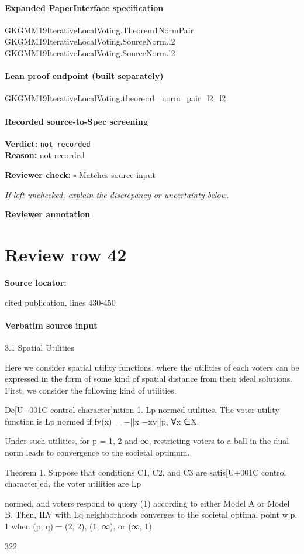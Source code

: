 \documentclass[10pt]{article}
\newcommand{\reviewerbox}{%
  \par\noindent\fbox{\parbox{0.96\linewidth}{\rule{0pt}{0.38in}}}\par
}
\newcommand{\reviewmatch}[1]{%
  \par\noindent\textbf{Reviewer check:} $\square$\; #1\par
  \noindent\emph{If left unchecked, explain the discrepancy or uncertainty below.}\par
}
\begin{document}
\paragraph{Expanded PaperInterface specification}
\begin{ReviewVerbatim}
GKGMM19IterativeLocalVoting.Theorem1NormPair GKGMM19IterativeLocalVoting.SourceNorm.l2
  GKGMM19IterativeLocalVoting.SourceNorm.l2
\end{ReviewVerbatim}

\paragraph{Lean proof endpoint (built separately)}\begin{ReviewVerbatim}
GKGMM19IterativeLocalVoting.theorem1_norm_pair_l2_l2
\end{ReviewVerbatim}

\paragraph{Recorded source-to-Spec screening}
\textbf{Verdict:} \texttt{not recorded}
\\
\textbf{Reason:} not recorded
\reviewmatch{Matches source input}
\noindent\textbf{Reviewer annotation}\par
\reviewerbox
\clearpage
\hypertarget{source-claim-eab074ea3e4eb48e}{}
\section*{Review row 42}
\textbf{Source locator:} {\footnotesize\raggedright cited publication, lines 430-\allowbreak{}450\par}
\paragraph{Verbatim source input}
\begin{ReviewVerbatim}
3.1 Spatial Utilities

Here we consider spatial utility functions, where the utilities of each voters can be expressed
in the form of some kind of spatial distance from their ideal solutions. First, we consider
the following kind of utilities.

De[U+001C control character]nition 1. Lp normed utilities. The voter utility function is Lp normed if fv(x) =
−||x −xv||p, ∀x ∈X.

Under such utilities, for p = 1, 2 and ∞, restricting voters to a ball in the dual norm
leads to convergence to the societal optimum.

Theorem 1. Suppose that conditions C1, C2, and C3 are satis[U+001C control character]ed, the voter utilities are Lp

normed, and voters respond to query (1) according to either Model A or Model B. Then,
ILV with Lq neighborhoods converges to the societal optimal point w.p. 1 when (p, q) = (2, 2),
(1, ∞), or (∞, 1).

322
\end{ReviewVerbatim}
\end{document}
